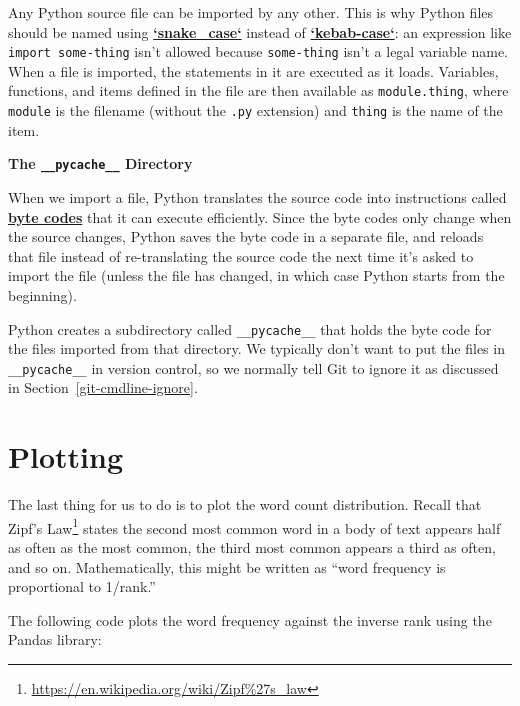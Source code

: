\documentclass[
]{krantz}
\renewenvironment{quote}{\begin{VF}}{\end{VF}}
\renewcommand{\href}[2]{#2\footnote{\url{#1}}}
\newcommand{\gref}[2]{\hyperlink{#2}{\textbf{#1}}}
\begin{document}
Any Python source file can be imported by any other.
This is why Python files should be named using \gref{`snake\_case`}{snake\_case}
instead of \gref{`kebab-case`}{kebab\_case}:
an expression like \texttt{import\ some-thing} isn't allowed
because \texttt{some-thing} isn't a legal variable name.
When a file is imported,
the statements in it are executed as it loads.
Variables, functions, and items defined in the file are then available as \texttt{module.thing},
where \texttt{module} is the filename (without the \texttt{.py} extension)
and \texttt{thing} is the name of the item.

\begin{quote}
\textbf{The \texttt{\_\_pycache\_\_} Directory}

When we import a file,
Python translates the source code into instructions called \gref{byte codes}{byte\_code}
that it can execute efficiently.
Since the byte codes only change when the source changes,
Python saves the byte code in a separate file,
and reloads that file instead of re-translating the source code
the next time it's asked to import the file
(unless the file has changed,
in which case Python starts from the beginning).

Python creates a subdirectory called \texttt{\_\_pycache\_\_}
that holds the byte code for the files imported from that directory.
We typically don't want to put the files in \texttt{\_\_pycache\_\_} in version control,
so we normally tell Git to ignore it as discussed in Section~\ref{git-cmdline-ignore}.
\end{quote}

\hypertarget{scripting-plotting}{%
\section{Plotting}\label{scripting-plotting}}

The last thing for us to do is to plot the word count distribution.
Recall that \href{https://en.wikipedia.org/wiki/Zipf\%27s_law}{Zipf's Law} states the second most common word in a body of text
appears half as often as the most common,
the third most common appears a third as often, and so on.
Mathematically, this might be written as
``word frequency is proportional to 1/rank.''

The following code plots the word frequency against the inverse rank
using the Pandas library:
\end{document}
